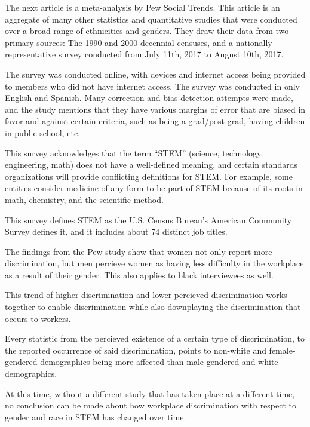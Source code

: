 \documentclass[a4paper,12pt]{article}
\begin{document}
	The next article\cite{pew} is a meta-analysis %
by Pew Social Trends. This article is an aggregate of many other statistics and quantitative studies that were conducted over a broad range of ethnicities and genders. They draw their data from two primary sources: The 1990 and 2000 decennial censuses, and a nationally representative %
survey conducted from July 11th, 2017 to August 10th, 2017. 

	The survey was conducted online, with devices and internet access being provided to members who did not have internet access. The survey was conducted in only English and Spanish. Many correction and bias-detection attempts were made, and the study mentions that they have various margins of error that are biased in favor and against certain criteria, such as being a grad/post-grad, having children in public school, etc.

	This survey acknowledges that the term ``STEM'' (science, technology, engineering, math) does not have a well-defined meaning, and certain standards organizations will provide conflicting definitions for STEM. For example, some entities consider medicine of any form to be part of STEM because of its roots in math, chemistry, and the scientific method.

	This survey %
defines STEM as the  U.S. Census Bureau’s American Community Survey defines it, and it includes about 74 distinct job titles.

	The findings from the Pew study show that women not only report more discrimination, 
but men percieve women as having less difficulty in the workplace as a result of their gender. 
This also applies to black interviewees as well.

	This trend of higher discrimination and lower percieved discrimination works together to enable
discrimination %
 while also downplaying the discrimination that occurs to workers.

	Every statistic from the percieved existence of a certain type of discrimination, to the reported occurrence
of said discrimination, points to non-white and female-gendered demographics being more affected than 
male-gendered and white demographics.

	At this time, without a different study that has taken place at a different time, no conclusion can
be made about how workplace discrimination with respect to gender and race in STEM has changed over time.

\end{document}
